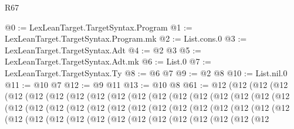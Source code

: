 \begin{lexlean}{R67}
\begin{coremodule}
@0 := LexLeanTarget.TargetSyntax.Program
@1 := LexLeanTarget.TargetSyntax.Program.mk
@2 := List.cons.{0}
@3 := LexLeanTarget.TargetSyntax.Adt
@4 := @2 @3
@5 := LexLeanTarget.TargetSyntax.Adt.mk
@6 := List.{0}
@7 := LexLeanTarget.TargetSyntax.Ty
@8 := @6 @7
@9 := @2 @8
@10 := List.nil.{0}
@11 := @10 @7
@12 := @9 @11
@13 := @10 @8
@61 := @12
    (@12
      (@12
        (@12
          (@12
            (@12
              (@12
                (@12
                  (@12
                    (@12
                      (@12
                        (@12
                          (@12
                            (@12
                              (@12
                                (@12
                                  (@12
                                    (@12
                                      (@12
                                        (@12
                                          (@12
                                            (@12
                                              (@12
                                                (@12
                                                  (@12
                                                    (@12
                                                      (@12
                                                        (@12
                                                          (@12
                                                            (@12
                                                              (@12
                                                                (@12
                                                                  (@12
                                                                    (@12
                                                                      (@12
                                                                        (@12
                                                                          (@12
                                                                            (@12
                                                                              (@12
                                                                                (@12
                                                                                  (@12
                                                                                    (@12
                                                                                      (@12
                                                                                        (@12
                                                                                          (@12

\end{coremodule}
\end{lexlean}
